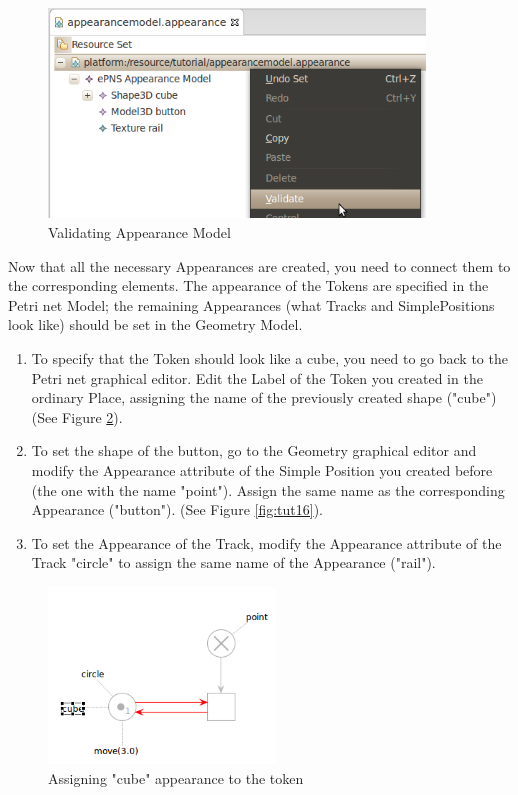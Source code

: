 \begin{figure}[htp]
\begin{center}
  \includegraphics[width=10.0cm]{image/tutorial/Tutorial_14.png}
  \caption{Validating Appearance Model}
  \label{fig:tut14}
\end{center}
\end{figure}

\newpage
Now that all the necessary Appearances are created, you need to connect them to the corresponding elements. The appearance of the Tokens are
specified in the Petri net Model; the remaining Appearances (what Tracks and SimplePositions look like) should be set in the Geometry Model.
\begin{enumerate}
  \item To specify that the Token should look like a cube, you need to go back to the Petri net graphical editor. Edit the Label of the Token you created in the ordinary Place, assigning the name of the previously created shape ("cube") (See Figure \ref{fig:tut15}).
  \item To set the shape of the button, go to the Geometry graphical editor and modify the Appearance attribute of the Simple Position you
  created before (the one with the name "point"). Assign the same name as the corresponding Appearance ("button"). (See Figure \ref{fig:tut16}).
  \item To set the Appearance of the Track, modify the Appearance attribute of the Track "circle" to assign the same name of the
  Appearance ("rail").
\end{enumerate}

\begin{figure}[htp]
\begin{center}
  \includegraphics[width=6.0cm]{image/tutorial/Tutorial_15.png}
  \caption{Assigning "cube" appearance to the token}
  \label{fig:tut15}
\end{center}
\end{figure}

